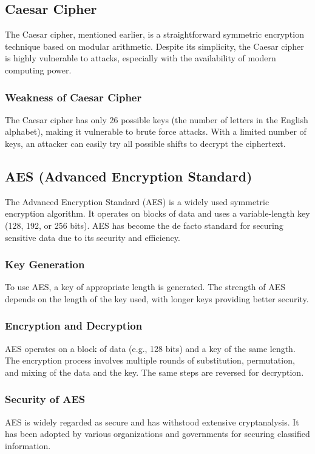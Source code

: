 \documentclass{article}
\begin{document}
\subsection{Caesar Cipher}
The Caesar cipher, mentioned earlier, is a straightforward symmetric encryption technique based on modular arithmetic. Despite its simplicity, the Caesar cipher is highly vulnerable to attacks, especially with the availability of modern computing power.

\subsubsection{Weakness of Caesar Cipher}
The Caesar cipher has only 26 possible keys (the number of letters in the English alphabet), making it vulnerable to brute force attacks. With a limited number of keys, an attacker can easily try all possible shifts to decrypt the ciphertext.

\subsection{AES (Advanced Encryption Standard)}
The Advanced Encryption Standard (AES) is a widely used symmetric encryption algorithm. It operates on blocks of data and uses a variable-length key (128, 192, or 256 bits). AES has become the de facto standard for securing sensitive data due to its security and efficiency.

\subsubsection{Key Generation}
To use AES, a key of appropriate length is generated. The strength of AES depends on the length of the key used, with longer keys providing better security.

\subsubsection{Encryption and Decryption}
AES operates on a block of data (e.g., 128 bits) and a key of the same length. The encryption process involves multiple rounds of substitution, permutation, and mixing of the data and the key. The same steps are reversed for decryption.

\subsubsection{Security of AES}
AES is widely regarded as secure and has withstood extensive cryptanalysis. It has been adopted by various organizations and governments for securing classified information.
\end{document}
